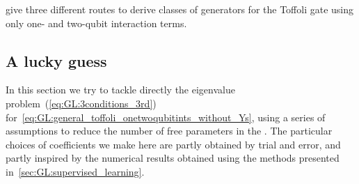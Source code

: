  give three different routes to derive classes of generators for the Toffoli gate using only one- and two-qubit interaction terms.

\subsection{A lucky guess \ccheck}
\label{subsec:GL:lucky_guess}

In this section we try to tackle directly the eigenvalue problem~(\ref{eq:GL:3conditions_3rd}) for~\cref{eq:GL:general_toffoli_onetwoqubitints_without_Ys}, using a series of assumptions to reduce the number of free parameters in the \ansatz. The particular choices of coefficients we make here are partly obtained by trial and error, and partly inspired by the numerical results obtained using the methods presented in~\cref{sec:GL:supervised_learning}.


